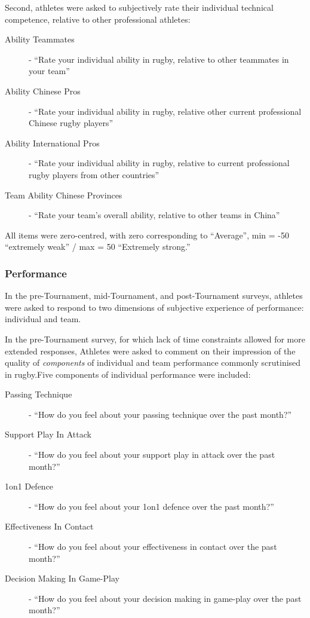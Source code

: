 Second, athletes were asked to subjectively rate their individual technical competence, relative to other professional athletes:

\begin{description}
\item[Ability Teammates] - ``Rate your individual ability in rugby, relative to other teammates in your team''
\item[Ability Chinese Pros] - ``Rate your individual ability in rugby, relative other current professional Chinese rugby players''
\item[Ability International Pros] - ``Rate your individual ability in rugby, relative to current professional rugby players from other countries''
\item[Team Ability Chinese Provinces] - ``Rate your team's overall ability, relative to other teams in China''
\end{description}

All items were zero-centred, with zero corresponding to  ``Average'', min = -50  ``extremely weak'' / max = 50  ``Extremely strong.'' \\




    \subsubsection{Performance}
In the pre-Tournament, mid-Tournament, and post-Tournament surveys, athletes were asked to respond to two dimensions of subjective experience of performance: individual and team.

In the pre-Tournament survey, for which lack of time constraints allowed for more extended responses, Athletes were asked to comment on their impression of the quality of \textit{components} of individual and team performance commonly scrutinised in rugby.Five components of individual performance were included:
\begin{description}
\item[Passing Technique] - ``How do you feel about your passing technique over the past month?''
\item[Support Play In Attack] - ``How do you feel about your support play in attack over the past month?''
\item[1on1 Defence] - ``How do you feel about your 1on1 defence over the past month?''
\item[Effectiveness In Contact] - ``How do you feel about your effectiveness in contact over the past month?''
\item[Decision Making In Game-Play] - ``How do you feel about your decision making in game-play over the past month?''
\end{description}
\bigskip

